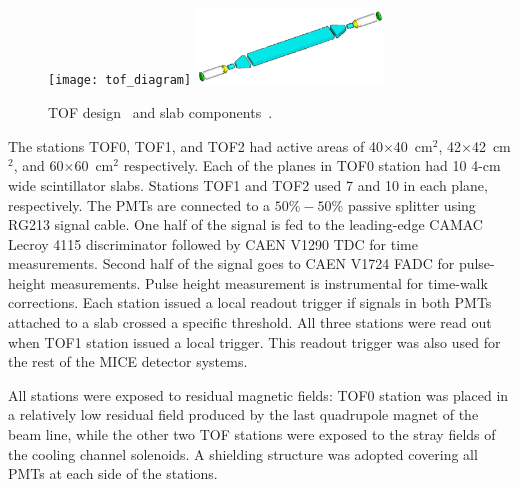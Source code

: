 \begin{figure}[!ht]
  \centering
  \texttt{[image: tof\_diagram]}
  \includegraphics[width=5cm]{slab_design}
  \caption{TOF design~\cite{Rayner:2011zz} and slab components~\cite{NOTE241}.}
  \label{fig:tof:schematic}
\end{figure}

The stations TOF0, TOF1, and TOF2 had active areas of
40$\times$40~cm$^2$, 42$\times$42~cm$^2$, and 60$\times$60~cm$^2$
respectively.  Each of the planes in TOF0 station had 10 4-cm wide
scintillator slabs. Stations TOF1 and TOF2 used 7 and
10 in each plane, respectively.
The PMTs are connected to a $50\%-50\%$ passive splitter using RG213 signal cable. One half of the signal is fed to
the leading-edge CAMAC Lecroy 4115 discriminator followed by CAEN
V1290 TDC for time measurements. Second half of the signal goes to
CAEN V1724 FADC for pulse-height measurements. Pulse height
measurement is instrumental for time-walk corrections. Each station
issued a local readout trigger if signals in both PMTs attached to a
slab crossed a specific threshold. All three stations were read out when
TOF1 station issued a local trigger. This readout trigger was also
used for the rest of the MICE detector systems.




All stations were exposed to residual magnetic fields: TOF0 station was placed in a relatively low residual field produced by the last quadrupole magnet of the beam line, while the other two TOF stations were exposed to the stray fields of the cooling channel solenoids. A shielding structure was adopted covering all PMTs at each side of the stations.

